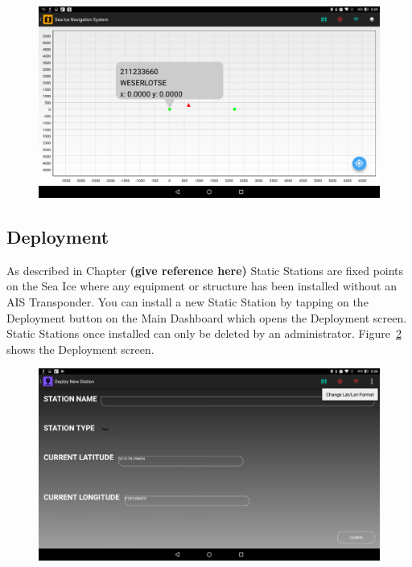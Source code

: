 \begin{figure}[h]
	\centering
	\includegraphics[height=0.3\textheight]{fig07/GridwithBox.png}
	\label{fig:CH7GridwithBox}
\end{figure}
%
\subsection{Deployment}
\label{subsec:subsec7_1_3}
\noindent
As described in Chapter \textbf{(give reference here)} Static Stations are fixed points on the Sea Ice where any equipment or structure has been installed without an AIS Transponder. You can install a new Static Station by tapping on the Deployment button on the Main Dashboard which opens the Deployment screen. Static Stations once installed can only be deleted by an administrator. Figure~\ref{fig:CH7StaticStationDeployment} shows the Deployment screen.
%
\begin{figure}[h]
	\centering
	\includegraphics[height=0.3\textheight]{fig07/StaticStationDeployment.png}
	\label{fig:CH7StaticStationDeployment}
\end{figure}
%
